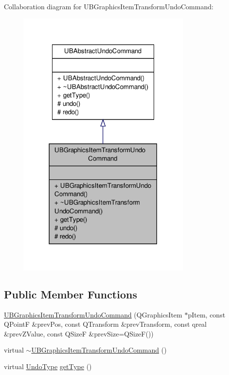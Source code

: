 Collaboration diagram for U\-B\-Graphics\-Item\-Transform\-Undo\-Command\-:
\nopagebreak
\begin{figure}[H]
\begin{center}
\leavevmode
\includegraphics[width=246pt]{d8/d24/class_u_b_graphics_item_transform_undo_command__coll__graph}
\end{center}
\end{figure}
\subsection*{Public Member Functions}
\begin{DoxyCompactItemize}
\item 
\hyperlink{class_u_b_graphics_item_transform_undo_command_a00c2869e3e97c0376e8dd23e2146db35}{U\-B\-Graphics\-Item\-Transform\-Undo\-Command} (Q\-Graphics\-Item $\ast$p\-Item, const Q\-Point\-F \&prev\-Pos, const Q\-Transform \&prev\-Transform, const qreal \&prev\-Z\-Value, const Q\-Size\-F \&prev\-Size=Q\-Size\-F())
\item 
virtual \hyperlink{class_u_b_graphics_item_transform_undo_command_acdbb01fcdde6f9582251bcd0b8edd0bd}{$\sim$\-U\-B\-Graphics\-Item\-Transform\-Undo\-Command} ()
\item 
virtual \hyperlink{class_u_b_abstract_undo_command_a85016029bd4ceb03a8247b3c01e2bd97}{Undo\-Type} \hyperlink{class_u_b_graphics_item_transform_undo_command_a1c68ca4bdb7998005d5b221adb00cdcf}{get\-Type} ()
\end{DoxyCompactItemize}
